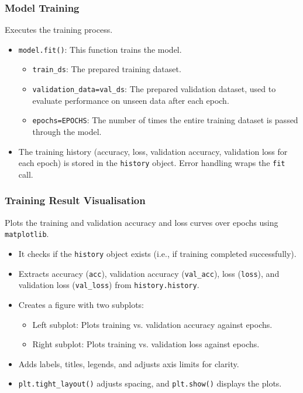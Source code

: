 \subsubsection{Model Training}
Executes the training process.
\begin{itemize}
    \item \verb|model.fit()|: This function trains the model.
    \begin{itemize}
        \item \verb|train_ds|: The prepared training dataset.
        \item \verb|validation_data=val_ds|: The prepared validation dataset, used to evaluate performance on unseen data after each epoch.
        \item \verb|epochs=EPOCHS|: The number of times the entire training dataset is passed through the model.
    \end{itemize}
    \item The training history (accuracy, loss, validation accuracy, validation loss for each epoch) is stored in the \verb|history| object. Error handling wraps the \verb|fit| call.
\end{itemize}

\subsubsection{Training Result Visualisation}
Plots the training and validation accuracy and loss curves over epochs using \verb|matplotlib|.
\begin{itemize}
    \item It checks if the \texttt{history} object exists (i.e., if training completed successfully).
    \item Extracts accuracy (\texttt{acc}), validation accuracy (\verb|val_acc|), loss (\texttt{loss}), and validation loss (\verb|val_loss|) from \texttt{history.history}.
    \item Creates a figure with two subplots:
    \begin{itemize}
        \item Left subplot: Plots training vs. validation accuracy against epochs.
        \item Right subplot: Plots training vs. validation loss against epochs.
    \end{itemize}
    \item Adds labels, titles, legends, and adjusts axis limits for clarity.
    \item \verb|plt.tight_layout()| adjusts spacing, and \texttt{plt.show()} displays the plots.
\end{itemize}

